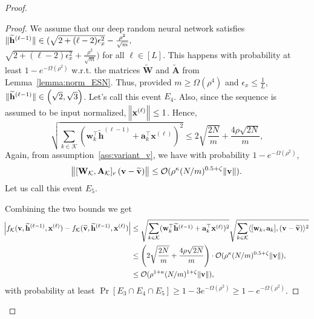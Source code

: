 \begin{proof}
\begin{proof}
		We assume that our deep random neural network satisfies $\norm[0]{\widetilde{\mathbf{h}}^{(\ell-1)}} \in (\sqrt{2 + (\ell - 2)\epsilon_x^2} - \frac{\rho^2}{\sqrt{m}},$\\$ \sqrt{2 + (\ell - 2)\epsilon_x^2} + 
		\frac{\rho^2}{\sqrt{m}})$ for all $\ell \in [L]$. This happens with probability at least $1-e^{-\Omega(\rho^2)}$ w.r.t. the matrices $\widetilde{\mathbf{W}}$ and $\widetilde{\mathbf{A}}$ from Lemma~\ref{lemma:norm_ESN}. Thus, provided $m \ge \Omega(\rho^4)$ and $\epsilon_x \le \frac{1}{L}$, $\norm[0]{\widetilde{\mathbf{h}}^{(\ell-1)}} \in \left( \sqrt{2}, \sqrt{3}\right)$. Let's call this event $E_4$. Also, since the sequence is assumed to be input normalized, $\norm{\mathbf{x}^{(\ell)}} \le 1$. Hence,
		\begin{equation*}
			\sqrt{\sum_{k \in \mathcal{K}}(\mathbf{w}_k^{\top} \widetilde{\mathbf{h}}^{(\ell-1)} + \mathbf{a}_k^{\top} \mathbf{x}^{(\ell)})^2} \leq 2\sqrt{\frac{2N}{m}}  + \frac{4\rho \sqrt{2N}}{m},
		\end{equation*}
		Again, from assumption~\ref{ass:variant_v}, we have with probability $1-e^{-\Omega(\rho^2)}$,
		\begin{align*}
			\norm{[\mathbf{W}_{\mathcal{K}}, \mathbf{A}_{\mathcal{K}}]_r \left(\mathbf{v} - \widetilde{\mathbf{v}}\right)} \le \mathcal{O}(\rho^{\kappa} (N/m)^{0.5 + \zeta} \norm{\mathbf{v}}).
		\end{align*}
		Let us call this event $E_5$.
		
		Combining the two bounds we get 
		\begin{align*}
			\abs{f_{\mathcal{K}}(\mathbf{v}, \widetilde{\mathbf{h}}^{(\ell-1)}, \mathbf{x}^{(\ell)}) - f_{\mathcal{K}}(\widetilde{\mathbf{v}}, \widetilde{\mathbf{h}}^{(\ell-1)}, \mathbf{x}^{(\ell)})}
			&\le \sqrt{\sum_{k \in \mathcal{K}}(\mathbf{w}_k^{\top} \widetilde{\mathbf{h}}^{(\ell-1)} + \mathbf{a}_k^{\top} \mathbf{x}^{(\ell)})^2} \sqrt{\sum_{k \in \mathcal{K}} \langle [\mathbf{w}_k, \mathbf{a}_k], (\mathbf{v} - \widetilde{\mathbf{v}}) \rangle^2} \\&
			\le \left(2\sqrt{\frac{2N}{m}}  + \frac{4\rho \sqrt{2N}}{m}\right) \cdot \mathcal{O}(\rho^{ \kappa} (N/m)^{0.5 + \zeta} \norm{\mathbf{v}}), \\&
			\le \mathcal{O}(\rho^{1 + \kappa} (N/m)^{1+\zeta} \norm{\mathbf{v}}),
		\end{align*}
		with probability at least $\Pr[E_3 \cap E_4 \cap E_5] \geq 1 - 3e^{-\Omega(\rho^2)} \ge 1 - e^{-\Omega(\rho^2)}$.
	\end{proof}
	

\end{proof}
